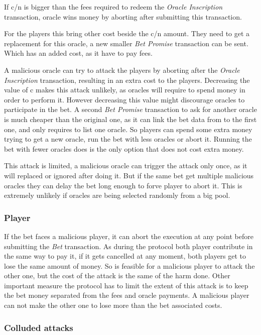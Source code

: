 If c/n is bigger than the fees required to redeem the
  \textit{Oracle Inscription} transaction, oracle wins money by aborting after
  submitting this transaction.

For the players this bring other cost beside the c/n amount.
They need to get a replacement for this oracle, a new smaller
  \textit{Bet Promise} transaction can be sent.
Which has an added cost, as it have to pay fees.

A malicious oracle can try to attack the players by aborting after the
  \textit{Oracle Inscription} transaction, resulting in an extra cost to the
  players.
Decreasing the value of c makes this attack unlikely, as oracles will require
  to spend money in order to perform it.
However decreasing this value might discourage oracles to participate in the
  bet.
A second \textit{Bet Promise} transaction to ask for another oracle is much
  cheaper than the original one, as it can link the bet data from to the first
  one, and only requires to list one oracle.
So players can spend some extra money trying to get a new oracle, run the bet
  with less oracles or abort it.
Running the bet with fewer oracles does is the only option that does not cost
  extra money.

This attack is limited, a malicious oracle can trigger the attack only once, as
  it will replaced or ignored after doing it.
But if the same bet get multiple malicious oracles they can delay the bet long
  enough to forve player to abort it.
This is extremely unlikely if oracles are being selected randomly from a big
  pool.

\subsubsection{Player} \label{subsec:individual_attack_player}
If the bet faces a malicious player, it can abort the execution at any point
  before submitting the \textit{Bet} transaction.
As during the protocol both player contribute in the same way to pay it, if it
  gets cancelled at any moment, both players get to lose the same amount of
  money.
So is feasible for a malicious player to attack the other one, but the cost
  of the attack is the same of the harm done.
Other important measure the protocol has to limit the extent of this attack
  is to keep the bet money separated from the fees and oracle payments.
A malicious player can not make the other one to lose more than the bet
  associated costs.

\subsubsection{Colluded attacks}\label{subsec:colluded_attacks}

